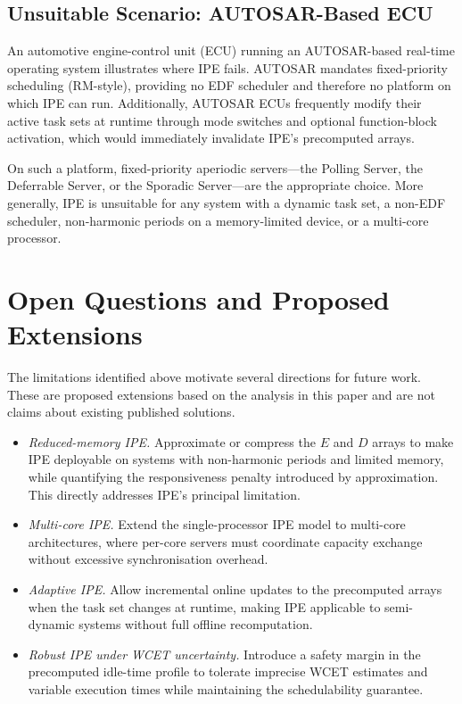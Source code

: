 \documentclass[conference]{IEEEtran}
\begin{document}
\subsection{Unsuitable Scenario: AUTOSAR-Based ECU}

An automotive engine-control unit (ECU) running an
AUTOSAR-based real-time operating system illustrates where
IPE fails. AUTOSAR mandates fixed-priority scheduling
(RM-style), providing no EDF scheduler and therefore no
platform on which IPE can run. Additionally, AUTOSAR ECUs
frequently modify their active task sets at runtime through
mode switches and optional function-block activation, which
would immediately invalidate IPE's precomputed arrays.

On such a platform, fixed-priority aperiodic servers---the
Polling Server, the Deferrable Server, or the Sporadic
Server---are the appropriate choice. More generally, IPE is
unsuitable for any system with a dynamic task set, a
non-EDF scheduler, non-harmonic periods on a
memory-limited device, or a multi-core processor.

\section{Open Questions and Proposed Extensions}
\label{sec:extensions}

The limitations identified above motivate several directions
for future work. These are proposed extensions based on the
analysis in this paper and are not claims about existing
published solutions.

\begin{itemize}
  \item \textit{Reduced-memory IPE.} Approximate or compress
    the $E$ and $D$ arrays to make IPE deployable on systems
    with non-harmonic periods and limited memory, while
    quantifying the responsiveness penalty introduced by
    approximation. This directly addresses IPE's principal
    limitation.
  \item \textit{Multi-core IPE.} Extend the single-processor
    IPE model to multi-core architectures, where per-core
    servers must coordinate capacity exchange without
    excessive synchronisation overhead.
  \item \textit{Adaptive IPE.} Allow incremental online
    updates to the precomputed arrays when the task set
    changes at runtime, making IPE applicable to
    semi-dynamic systems without full offline recomputation.
  \item \textit{Robust IPE under WCET uncertainty.}
    Introduce a safety margin in the precomputed idle-time
    profile to tolerate imprecise WCET estimates and variable
    execution times while maintaining the schedulability
    guarantee.
\end{itemize}
\end{document}
